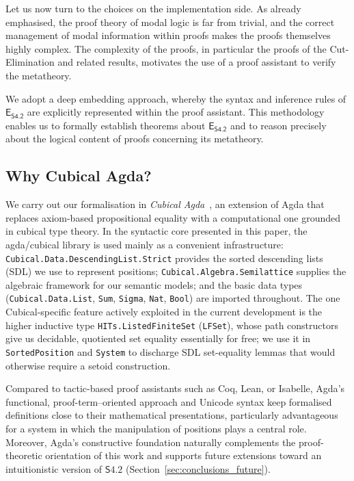\documentclass{article}
\newcommand{\logic}{\mathsf{S4.2}}
\newcommand{\eseq}{\mathsf{E}_{{\textsf{S4.2}}}}
\newcommand{\agda}{\textsf{Agda}}
\theoremstyle{definition}
\begin{document}
Let us now turn to the choices on the implementation side. As already emphasised, the proof theory of modal logic is far from trivial, and the correct management of modal information within proofs makes the proofs themselves highly complex.
The complexity of the proofs, in particular the proofs of the Cut-Elimination and related results, motivates the use of a proof assistant to verify the metatheory.


We adopt a deep embedding approach, whereby the syntax and inference rules of $\eseq$ are explicitly represented within the proof assistant. This methodology enables us to formally establish theorems about $\eseq$ and to reason precisely about the logical content of proofs concerning its metatheory.





\subsection{Why Cubical \agda?}
We carry out our formalisation in \emph{Cubical \agda}~\cite{VMA2021:CubicalAgda,AgdaTeam2025:Documentation}, an extension of \agda{} that replaces axiom-based propositional equality with a computational one grounded in cubical type theory.
In the syntactic core presented in this paper, the \textsf{agda/cubical} library is used mainly as a convenient infrastructure: \texttt{Cubical.Data.DescendingList.Strict} provides the sorted descending lists (SDL) we use to represent positions; \texttt{Cubical.Algebra.Semilattice} supplies the algebraic framework for our semantic models; and the basic data types (\texttt{Cubical.Data.List}, \texttt{Sum}, \texttt{Sigma}, \texttt{Nat}, \texttt{Bool}) are imported throughout.
The one Cubical-specific feature actively exploited in the current development is the higher inductive type \texttt{HITs.ListedFiniteSet} (\texttt{LFSet}), whose path constructors give us decidable, quotiented set equality essentially for free; we use it in \texttt{SortedPosition} and \texttt{System} to discharge SDL set-equality lemmas that would otherwise require a setoid construction.

Compared to tactic-based proof assistants such as Coq, Lean, or Isabelle, \agda{}'s functional, proof-term--oriented approach and Unicode syntax keep formalised definitions close to their mathematical presentations, particularly advantageous for a system in which the manipulation of positions plays a central role.
Moreover, \agda{}'s constructive foundation naturally complements the proof-theoretic orientation of this work and supports future extensions toward an intuitionistic version of $\logic$ (Section~\ref{sec:conclusions_future}).
\end{document}
